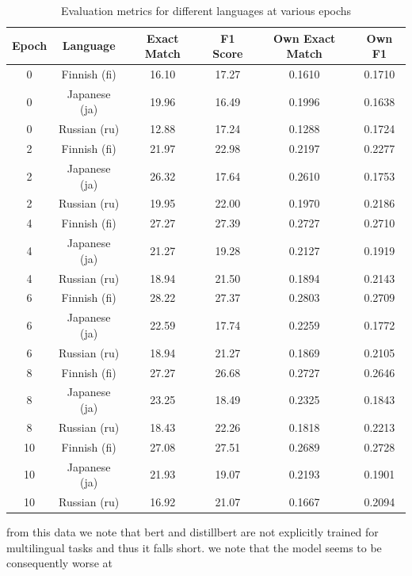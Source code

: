 \documentclass[11pt]{article}
\begin{document}
\begin{table}[ht]
    \centering
    \begin{tabular}{|c|c|c|c|c|c|}
        \hline
        Epoch & Language & Exact Match & F1 Score & Own Exact Match & Own F1 \\
        \hline
        0 & Finnish (fi) & 16.10 & 17.27 & 0.1610 & 0.1710 \\
        0 & Japanese (ja) & 19.96 & 16.49 & 0.1996 & 0.1638 \\
        0 & Russian (ru) & 12.88 & 17.24 & 0.1288 & 0.1724 \\
        \hline
        2 & Finnish (fi) & 21.97 & 22.98 & 0.2197 & 0.2277 \\
        2 & Japanese (ja) & 26.32 & 17.64 & 0.2610 & 0.1753 \\
        2 & Russian (ru) & 19.95 & 22.00 & 0.1970 & 0.2186 \\
        \hline
        4 & Finnish (fi) & 27.27 & 27.39 & 0.2727 & 0.2710 \\
        4 & Japanese (ja) & 21.27 & 19.28 & 0.2127 & 0.1919 \\
        4 & Russian (ru) & 18.94 & 21.50 & 0.1894 & 0.2143 \\
        \hline
        6 & Finnish (fi) & 28.22 & 27.37 & 0.2803 & 0.2709 \\
        6 & Japanese (ja) & 22.59 & 17.74 & 0.2259 & 0.1772 \\
        6 & Russian (ru) & 18.94 & 21.27 & 0.1869 & 0.2105 \\
        \hline
        8 & Finnish (fi) & 27.27 & 26.68 & 0.2727 & 0.2646 \\
        8 & Japanese (ja) & 23.25 & 18.49 & 0.2325 & 0.1843 \\
        8 & Russian (ru) & 18.43 & 22.26 & 0.1818 & 0.2213 \\
        \hline
        10 & Finnish (fi) & 27.08 & 27.51 & 0.2689 & 0.2728 \\
        10 & Japanese (ja) & 21.93 & 19.07 & 0.2193 & 0.1901 \\
        10 & Russian (ru) & 16.92 & 21.07 & 0.1667 & 0.2094 \\
        \hline
    \end{tabular}
    \caption{Evaluation metrics for different languages at various epochs}
    \label{tab:evaluation_metrics}
\end{table}


from this data 
we note that bert and distillbert are not explicitly trained for multilingual tasks and thus it falls short. 
we note that the model seems to be consequently worse at 
\end{document}
